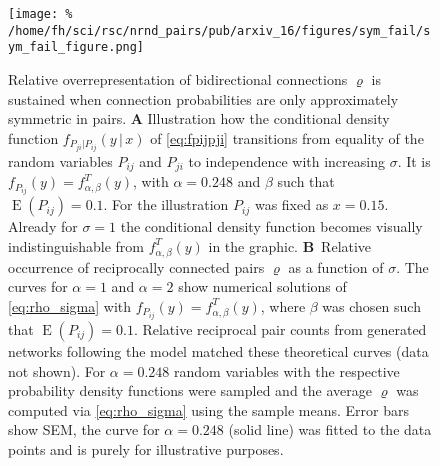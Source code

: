 \vspace{0.2cm}
\begin{figure}[h!]
\centering
\texttt{[image: \%
  /home/fh/sci/rsc/nrnd\_pairs/pub/arxiv\_16/figures/sym\_fail/sym\_fail\_figure.png]}
\caption{Relative overrepresentation of bidirectional connections $\varrho$ is sustained when connection probabilities are only approximately symmetric in pairs. \textbf{A} Illustration how the conditional density function $f_{P_{ji} | P_{ij}} (y\,\vert\, x)$ of \eqref{eq:fpijpji} transitions from equality of the random variables $P_{ij}$ and $P_{ji}$ to independence with increasing $\sigma$. It is $f_{P_{ij}} (y) = f^T_{\alpha,\beta}(y)$, with $\alpha=0.248$ and $\beta$ such that $\operatorname{E}(P_{ij})=0.1$. For the illustration $P_{ij}$ was fixed as $x=0.15$. Already for $\sigma=1$ the conditional density function becomes visually indistinguishable from  $f^T_{\alpha,\beta}(y)$ in the graphic. \textbf{B}~Relative occurrence of reciprocally connected pairs $\varrho$ as a function of $\sigma$. The curves for $\alpha=1$ and $\alpha=2$ show numerical solutions of \eqref{eq:rho_sigma} with $f_{P_{ij}}(y) = f_{\alpha,\beta}^T(y)$, where $\beta$ was chosen such that $\operatorname{E}(P_{ij}) = 0.1$. Relative reciprocal pair counts from generated networks following the model matched these theoretical curves (data not shown). For $\alpha = 0.248$ random variables with the respective probability density functions were sampled and the average $\varrho$ was computed via \eqref{eq:rho_sigma} using the sample means. Error bars show SEM, the curve for $\alpha = 0.248$ (solid line)  was fitted to the data points and is purely for illustrative purposes.} 
\label{fig:sym_fail}
\end{figure}


%

